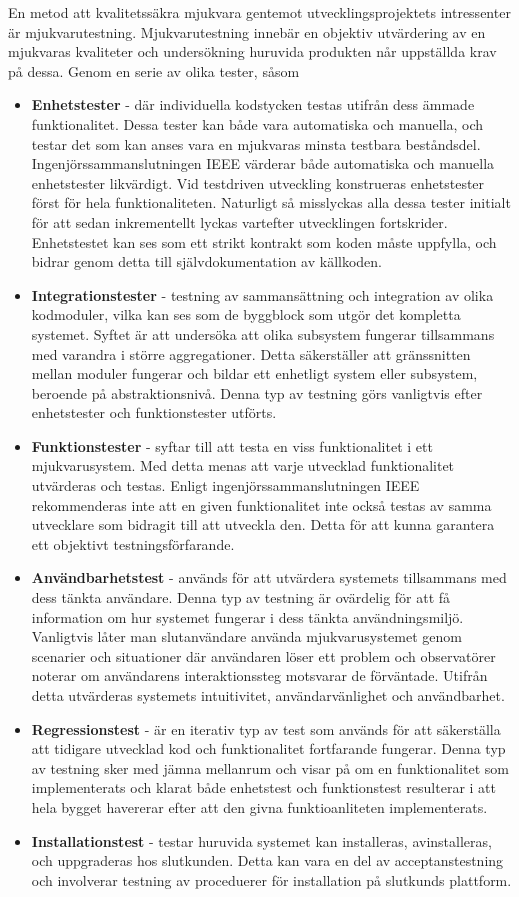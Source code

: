 En metod att kvalitetssäkra mjukvara gentemot utvecklingsprojektets intressenter är mjukvarutestning. Mjukvarutestning innebär en objektiv utvärdering av en mjukvaras kvaliteter och undersökning huruvida produkten når uppställda krav på dessa. Genom en serie av olika tester, såsom 
\begin{itemize}
\item \textbf{Enhetstester} - där individuella kodstycken testas utifrån dess ämmade funktionalitet. Dessa tester kan både vara automatiska och manuella, och testar det som kan anses vara en mjukvaras minsta testbara beståndsdel. Ingenjörssammanslutningen IEEE värderar både automatiska och manuella enhetstester likvärdigt. Vid testdriven utveckling konstrueras enhetstester först för hela funktionaliteten. Naturligt så misslyckas alla dessa tester initialt för att sedan inkrementellt lyckas vartefter utvecklingen fortskrider. Enhetstestet kan ses som ett strikt kontrakt som koden måste uppfylla, och bidrar genom detta till självdokumentation av källkoden. 
\item \textbf{Integrationstester} - testning av sammansättning och integration av olika kodmoduler, vilka kan ses som de byggblock som utgör det kompletta systemet. Syftet är att undersöka att olika subsystem fungerar tillsammans med varandra i större aggregationer. Detta säkerställer att gränssnitten mellan moduler fungerar och bildar ett enhetligt system eller subsystem, beroende på abstraktionsnivå. Denna typ av testning görs vanligtvis efter enhetstester och funktionstester utförts.
\item \textbf{Funktionstester} - syftar till att testa en viss funktionalitet i ett mjukvarusystem. Med detta menas att varje utvecklad funktionalitet utvärderas och testas. Enligt ingenjörssammanslutningen IEEE rekommenderas inte att en given funktionalitet inte också testas av samma utvecklare som bidragit till att utveckla den. Detta för att kunna garantera ett objektivt testningsförfarande. 
\item \textbf{Användbarhetstest} - används för att utvärdera systemets tillsammans med dess tänkta användare. Denna typ av testning är ovärdelig för att få information om hur systemet fungerar i dess tänkta användningsmiljö. Vanligtvis låter man slutanvändare använda mjukvarusystemet genom scenarier och situationer där användaren löser ett problem och observatörer noterar om användarens interaktionssteg motsvarar de förväntade. Utifrån detta utvärderas systemets intuitivitet, användarvänlighet och användbarhet. 
\item \textbf{Regressionstest} - är en iterativ typ av test som används för att säkerställa att tidigare utvecklad kod och funktionalitet fortfarande fungerar. Denna typ av testning sker med jämna mellanrum och visar på om en funktionalitet som implementerats och klarat både enhetstest och funktionstest resulterar i att hela bygget havererar efter att den givna funktioanliteten implementerats. 
\item \textbf{Installationstest} - testar huruvida systemet kan installeras, avinstalleras, och uppgraderas hos slutkunden. Detta kan vara en del av acceptanstestning och involverar testning av proceduerer för installation på slutkunds plattform.
\end{itemize}

